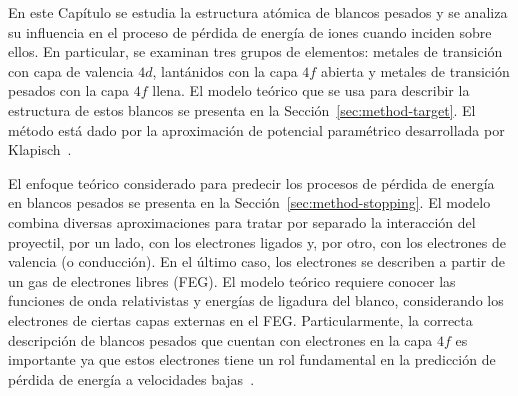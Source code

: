 En este Capítulo se estudia la estructura atómica de blancos pesados 
y se analiza su influencia en el proceso de pérdida de energía de iones 
cuando inciden sobre ellos. 
En particular, se examinan tres grupos de elementos: metales de 
transición con capa de valencia $4d$, lantánidos con la capa $4f$ 
abierta y metales de transición pesados con la capa $4f$ llena. 
El modelo teórico que se usa para describir la estructura de estos 
blancos se presenta en la Sección~\ref{sec:method-target}. El método 
está dado por la aproximación de potencial paramétrico desarrollada por 
Klapisch~\cite{Klapisch:77,Klapisch:67,Klapisch:71,BarShalom:01}. 

El enfoque teórico considerado para predecir los procesos de pérdida de 
energía en blancos pesados se presenta en la 
Sección~\ref{sec:method-stopping}. El modelo combina diversas 
aproximaciones para tratar por separado la interacción del proyectil, 
por un lado, con los electrones ligados y, por otro, con los 
electrones de valencia (o conducción). En el último caso, los electrones 
se describen a partir de un gas de electrones libres (FEG). 
El modelo teórico requiere conocer las funciones de onda relativistas y 
energías de ligadura del blanco, considerando los electrones de ciertas
capas externas en el FEG. Particularmente, la correcta descripción de 
blancos pesados que cuentan con electrones en la capa $4f$ es importante 
ya que estos electrones tiene un rol fundamental en la predicción de 
pérdida de energía a velocidades bajas~\cite{Roth:17}. 

